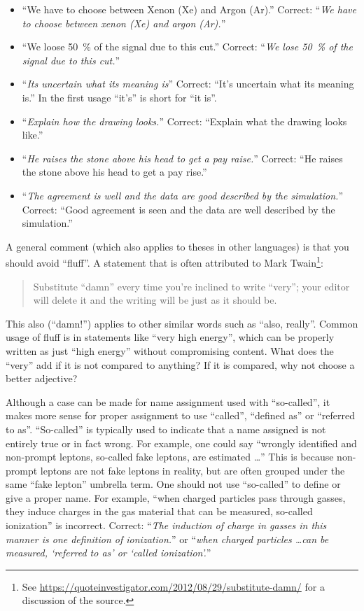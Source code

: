 \begin{itemize}
\item \enquote{We have to choose between Xenon (Xe)  and Argon (Ar).}
  Correct: \enquote{\emph{We have to choose between xenon (Xe) and argon (Ar).}}
\item \enquote{We loose \qty{50}{\%} of the signal due to this cut.}
  Correct: \enquote{\emph{We lose \qty{50}{\%} of the signal due to this cut.}}
\item  \enquote{\emph{Its uncertain what its meaning is}}
  Correct: \enquote{It's uncertain what its meaning is.}
  In the first usage \enquote{it's} is short for \enquote{it is}.
\item \enquote{\emph{Explain how the drawing looks.}}
  Correct: \enquote{Explain what the drawing looks like.}
\item \enquote{\emph{He raises the stone above his head to get a pay raise.}}
  Correct: \enquote{He raises the stone above his head to get a pay rise.}
\item \enquote{\emph{The agreement is well and the data are good described by the simulation.}}
  Correct: \enquote{Good agreement is seen and the data are well described by the simulation.}
\end{itemize}

A general comment (which also applies to theses in other languages) is that you should avoid \enquote{fluff}.
A statement that is often attributed to Mark Twain\footnote{%
See \url{https://quoteinvestigator.com/2012/08/29/substitute-damn/} for a discussion of the source.}:
\begin{quote}
  Substitute \enquote{damn} every time you're inclined to write \enquote{very};
  your editor will delete it and the writing will be just as it should be.
\end{quote}
This also (\enquote{damn!}) applies to other similar words such as \enquote{also, really}.
Common usage of fluff is in statements like \enquote{very high energy},
which can be properly written as just \enquote{high energy} without compromising content.
What does the \enquote{very} add if it is not compared to anything?
If it is compared, why not choose a better adjective?

Although a case can be made for name assignment used with \enquote{so-called},
it makes more sense for proper assignment to use
\enquote{called}, \enquote{defined as} or \enquote{referred to as}.
\enquote{So-called} is typically used to indicate that a name assigned is not entirely true or in fact wrong.
For example, one could say \enquote{wrongly identified and non-prompt leptons,
so-called fake leptons, are estimated \ldots}
This is because non-prompt leptons are not fake leptons in reality,
but are often grouped under the same \enquote{fake lepton} umbrella term.
One should not use \enquote{so-called} to define or give a proper name.
For example, \enquote{when charged particles pass through gasses,
they induce charges in the gas material that can be measured, so-called ionization} is incorrect.
Correct: \enquote{\emph{The induction of charge in gasses in this manner 
is one definition of ionization.}}
or \enquote{\emph{when charged particles \ldots can be measured,
\enquote{referred to as} or \enquote{called ionization}.}}
 
